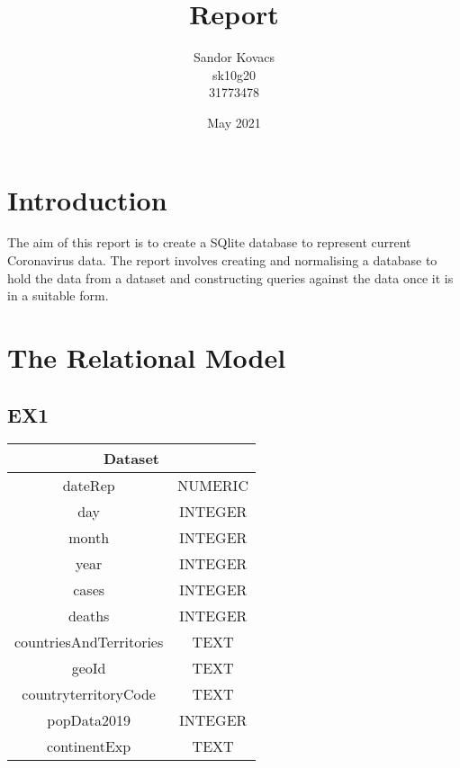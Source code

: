 \documentclass{article}
\title{Report}
\author{Sandor Kovacs\\sk10g20\\31773478}
\date{May 2021}
\begin{document}
\maketitle

\section{Introduction}
The aim of this report is to create a SQlite database to represent current Coronavirus data. The report involves creating and normalising a database to hold the data from a dataset and constructing queries against the data once it is in a suitable form.
\section{The Relational Model}
\subsection{EX1}
\begin{tabular}{|c|c|}
     \hline
     \multicolumn{2}{|c|}{Dataset} \\
     \hline dateRep & NUMERIC \\
     \hline day & INTEGER \\
     \hline month & INTEGER \\
     \hline year & INTEGER \\
     \hline cases & INTEGER \\
     \hline deaths & INTEGER \\
     \hline countriesAndTerritories & TEXT \\
     \hline geoId & TEXT \\
     \hline countryterritoryCode & TEXT \\
     \hline popData2019 & INTEGER \\
     \hline continentExp & TEXT \\
     \hline
\end{tabular}
\end{document}
